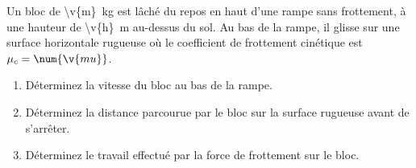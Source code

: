 Un bloc de \qty{\v{m}}{kg} est lâché du repos en haut d'une rampe sans frottement, à une hauteur de \qty{\v{h}}{m} au-dessus du sol. Au bas de la rampe, il glisse sur une surface horizontale rugueuse où le coefficient de frottement cinétique est $\mu_c = \num{\v{mu}}$.

\begin{enumerate}[label=\alph*)]
    \item Déterminez la vitesse du bloc au bas de la rampe.
    \item Déterminez la distance parcourue par le bloc sur la surface rugueuse avant de s'arrêter.
    \item Déterminez le travail effectué par la force de frottement sur le bloc.
\end{enumerate}

